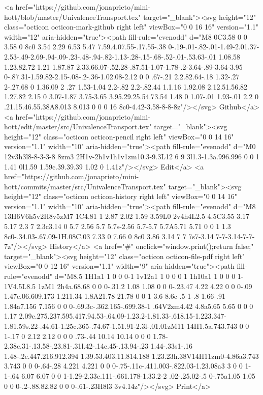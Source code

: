       <a href="https://github.com/jonaprieto/mini-hott/blob/master/UnivalenceTransport.tex" target="_blank"><svg height="12" class="octicon octicon-mark-github right left" viewBox="0 0 16 16" version="1.1" width="12" aria-hidden="true"><path fill-rule="evenodd" d="M8 0C3.58 0 0 3.58 0 8c0 3.54 2.29 6.53 5.47 7.59.4.07.55-.17.55-.38 0-.19-.01-.82-.01-1.49-2.01.37-2.53-.49-2.69-.94-.09-.23-.48-.94-.82-1.13-.28-.15-.68-.52-.01-.53.63-.01 1.08.58 1.23.82.72 1.21 1.87.87 2.33.66.07-.52.28-.87.51-1.07-1.78-.2-3.64-.89-3.64-3.95 0-.87.31-1.59.82-2.15-.08-.2-.36-1.02.08-2.12 0 0 .67-.21 2.2.82.64-.18 1.32-.27 2-.27.68 0 1.36.09 2 .27 1.53-1.04 2.2-.82 2.2-.82.44 1.1.16 1.92.08 2.12.51.56.82 1.27.82 2.15 0 3.07-1.87 3.75-3.65 3.95.29.25.54.73.54 1.48 0 1.07-.01 1.93-.01 2.2 0 .21.15.46.55.38A8.013 8.013 0 0 0 16 8c0-4.42-3.58-8-8-8z"/></svg> Github</a>
      <a href="https://github.com/jonaprieto/mini-hott/edit/master/src/UnivalenceTransport.tex" target="_blank"><svg height="12" class="octicon octicon-pencil right left" viewBox="0 0 14 16" version="1.1" width="10" aria-hidden="true"><path fill-rule="evenodd" d="M0 12v3h3l8-8-3-3-8 8zm3 2H1v-2h1v1h1v1zm10.3-9.3L12 6 9 3l1.3-1.3a.996.996 0 0 1 1.41 0l1.59 1.59c.39.39.39 1.02 0 1.41z"/></svg> Edit</a>
      <a href="https://github.com/jonaprieto/mini-hott/commits/master/src/UnivalenceTransport.tex" target="_blank"><svg height="12" class="octicon octicon-history right left" viewBox="0 0 14 16" version="1.1" width="10" aria-hidden="true"><path fill-rule="evenodd" d="M8 13H6V6h5v2H8v5zM7 1C4.81 1 2.87 2.02 1.59 3.59L0 2v4h4L2.5 4.5C3.55 3.17 5.17 2.3 7 2.3c3.14 0 5.7 2.56 5.7 5.7s-2.56 5.7-5.7 5.7A5.71 5.71 0 0 1 1.3 8c0-.34.03-.67.09-1H.08C.03 7.33 0 7.66 0 8c0 3.86 3.14 7 7 7s7-3.14 7-7-3.14-7-7-7z"/></svg> History</a>
      <a  href="#" onclick="window.print();return false;" target="_blank"><svg height="12" class="octicon octicon-file-pdf right left" viewBox="0 0 12 16" version="1.1" width="9" aria-hidden="true"><path fill-rule="evenodd" d="M8.5 1H1a1 1 0 0 0-1 1v12a1 1 0 0 0 1 1h10a1 1 0 0 0 1-1V4.5L8.5 1zM1 2h4a.68.68 0 0 0-.31.2 1.08 1.08 0 0 0-.23.47 4.22 4.22 0 0 0-.09 1.47c.06.609.173 1.211.34 1.8A21.78 21.78 0 0 1 3.6 8.6c-.5 1-.8 1.66-.91 1.84a7.156 7.156 0 0 0-.69.3c-.362.165-.699.38-1 .64V2zm4.42 4.8a5.65 5.65 0 0 0 1.17 2.09c.275.237.595.417.94.53-.64.09-1.23.2-1.81.33-.618.15-1.223.347-1.81.59s.22-.44.61-1.25c.365-.74.67-1.51.91-2.3l-.01.01zM11 14H1.5a.743.743 0 0 1-.17 0 2.12 2.12 0 0 0 .73-.44 10.14 10.14 0 0 0 1.78-2.38c.31-.13.58-.23.81-.31l.42-.14c.45-.13.94-.23 1.44-.33s1-.16 1.48-.2c.447.216.912.394 1.39.53.403.11.814.188 1.23.23h.38V14H11zm0-4.86a3.743 3.743 0 0 0-.64-.28 4.221 4.221 0 0 0-.75-.11c-.411.003-.822.03-1.23.08a3 3 0 0 1-1-.64 6.07 6.07 0 0 1-1.29-2.33c.111-.661.178-1.33.2-2 .02-.25.02-.5 0-.75a1.05 1.05 0 0 0-.2-.88.82.82 0 0 0-.61-.23H8l3 3v4.14z"/></svg> Print</a>
